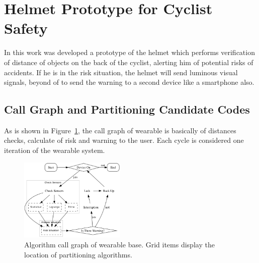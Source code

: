 \section{Helmet Prototype for Cyclist Safety} \label{chap:prototipo}

    In this work was developed a prototype of the helmet which performs verification of distance of objects on the back of the cyclist, alerting him of potential risks of accidents.
    If he is in the risk situation, the helmet will send luminous visual signals, beyond of to send the warning to a second device like a smartphone also.
    

    \subsection{Call Graph and Partitioning Candidate Codes}
        
        As is shown in Figure~\ref{fig:gc}, the call graph of wearable is basically of distances checks, calculate of risk and warning to the user.
        Each cycle is considered one iteration of the wearable system.
        
        \begin{figure}[h] \centering
            \vspace{-0.5em}
            \includegraphics[width=0.45\textwidth]{img/capacete.png}
            \caption{Algorithm call graph of wearable base. Grid items display the location of partitioning algorithms.}
            \label{fig:gc}
        \end{figure}
        
